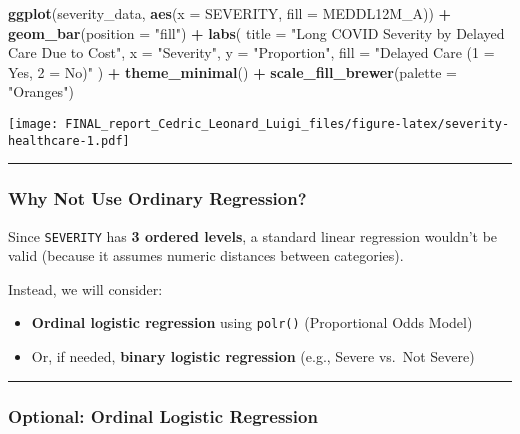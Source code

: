 \documentclass[
]{article}
\newenvironment{Shaded}{\begin{snugshade}}{\end{snugshade}}
\newcommand{\AttributeTok}[1]{\textcolor[rgb]{0.13,0.29,0.53}{#1}}
\newcommand{\FunctionTok}[1]{\textcolor[rgb]{0.13,0.29,0.53}{\textbf{#1}}}
\newcommand{\NormalTok}[1]{#1}
\newcommand{\SpecialCharTok}[1]{\textcolor[rgb]{0.81,0.36,0.00}{\textbf{#1}}}
\newcommand{\StringTok}[1]{\textcolor[rgb]{0.31,0.60,0.02}{#1}}
\providecommand{\tightlist}{%
  \setlength{\itemsep}{0pt}\setlength{\parskip}{0pt}}
\begin{document}
\begin{Shaded}
\begin{Highlighting}[]
\FunctionTok{ggplot}\NormalTok{(severity\_data, }\FunctionTok{aes}\NormalTok{(}\AttributeTok{x =}\NormalTok{ SEVERITY, }\AttributeTok{fill =}\NormalTok{ MEDDL12M\_A)) }\SpecialCharTok{+}
  \FunctionTok{geom\_bar}\NormalTok{(}\AttributeTok{position =} \StringTok{"fill"}\NormalTok{) }\SpecialCharTok{+}
  \FunctionTok{labs}\NormalTok{(}
    \AttributeTok{title =} \StringTok{"Long COVID Severity by Delayed Care Due to Cost"}\NormalTok{,}
    \AttributeTok{x =} \StringTok{"Severity"}\NormalTok{,}
    \AttributeTok{y =} \StringTok{"Proportion"}\NormalTok{,}
    \AttributeTok{fill =} \StringTok{"Delayed Care (1 = Yes, 2 = No)"}
\NormalTok{  ) }\SpecialCharTok{+}
  \FunctionTok{theme\_minimal}\NormalTok{() }\SpecialCharTok{+}
  \FunctionTok{scale\_fill\_brewer}\NormalTok{(}\AttributeTok{palette =} \StringTok{"Oranges"}\NormalTok{)}
\end{Highlighting}
\end{Shaded}

\texttt{[image: FINAL\_report\_Cedric\_Leonard\_Luigi\_files/figure-latex/severity-healthcare-1.pdf]}

\begin{center}\rule{0.5\linewidth}{0.5pt}\end{center}

\subsubsection{Why Not Use Ordinary
Regression?}\label{why-not-use-ordinary-regression}

Since \texttt{SEVERITY} has \textbf{3 ordered levels}, a standard linear
regression wouldn't be valid (because it assumes numeric distances
between categories).

Instead, we will consider:

\begin{itemize}
\tightlist
\item
  \textbf{Ordinal logistic regression} using \texttt{polr()}
  (Proportional Odds Model)
\item
  Or, if needed, \textbf{binary logistic regression} (e.g., Severe
  vs.~Not Severe)
\end{itemize}

\begin{center}\rule{0.5\linewidth}{0.5pt}\end{center}

\subsubsection{Optional: Ordinal Logistic
Regression}\label{optional-ordinal-logistic-regression}
\end{document}
